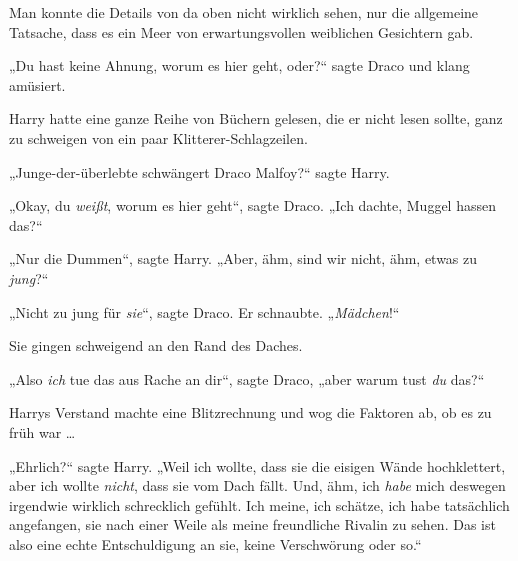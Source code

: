 \later

Man konnte die Details von da oben nicht wirklich sehen, nur die allgemeine Tatsache, dass es ein Meer von erwartungsvollen weiblichen Gesichtern gab.

„Du hast keine Ahnung, worum es hier geht, oder?“ sagte Draco und klang amüsiert.

Harry hatte eine ganze Reihe von Büchern gelesen, die er nicht lesen sollte, ganz zu schweigen von ein paar Klitterer-Schlagzeilen.

„Junge-der-überlebte schwängert Draco Malfoy?“ sagte Harry.

„Okay, du \emph{weißt}, worum es hier geht“, sagte Draco.
„Ich dachte, Muggel hassen das?“

„Nur die Dummen“, sagte Harry.
„Aber, ähm, sind wir nicht, ähm, etwas zu \emph{jung}?“

„Nicht zu jung für \emph{sie}“, sagte Draco. Er schnaubte.
„\emph{Mädchen}!“

Sie gingen schweigend an den Rand des Daches.

„Also \emph{ich} tue das aus Rache an dir“, sagte Draco, „aber warum tust \emph{du} das?“

Harrys Verstand machte eine Blitzrechnung und wog die Faktoren ab, ob es zu früh war …

„Ehrlich?“ sagte Harry.
„Weil ich wollte, dass sie die eisigen Wände hochklettert, aber ich wollte \emph{nicht}, dass sie vom Dach fällt. Und, ähm, ich \emph{habe} mich deswegen irgendwie wirklich schrecklich gefühlt. Ich meine, ich schätze, ich habe tatsächlich angefangen, sie nach einer Weile als meine freundliche Rivalin zu sehen. Das ist also eine echte Entschuldigung an sie, keine Verschwörung oder so.“

